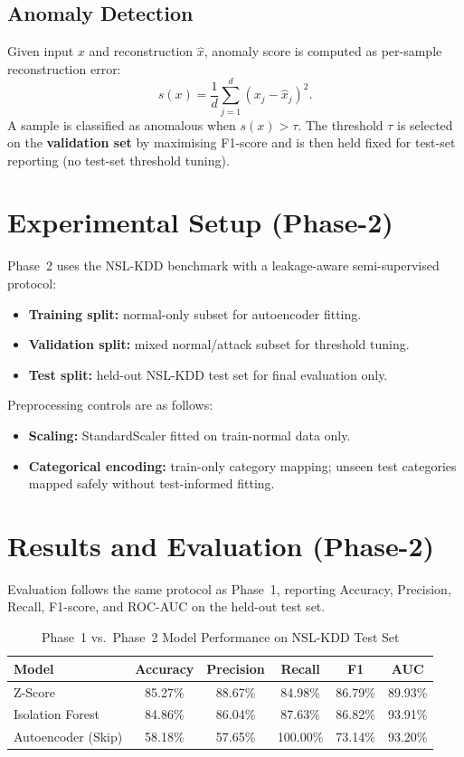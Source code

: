 \documentclass[conference]{IEEEtran}
\begin{document}
\subsection{Anomaly Detection}
Given input \(x\) and reconstruction \(\hat{x}\), anomaly score is computed as
per-sample reconstruction error:
\[
s(x)=\frac{1}{d}\sum_{j=1}^{d}(x_j-\hat{x}_j)^2.
\]
A sample is classified as anomalous when \(s(x)>\tau\). The threshold \(\tau\) is
selected on the \textbf{validation set} by maximising F1-score and is then held
fixed for test-set reporting (no test-set threshold tuning).

\section{Experimental Setup (Phase-2)}
\label{sec:phase2_setup}

Phase~2 uses the NSL-KDD benchmark with a leakage-aware semi-supervised protocol:
\begin{itemize}
  \item \textbf{Training split:} normal-only subset for autoencoder fitting.
  \item \textbf{Validation split:} mixed normal/attack subset for threshold tuning.
  \item \textbf{Test split:} held-out NSL-KDD test set for final evaluation only.
\end{itemize}

\noindent Preprocessing controls are as follows:
\begin{itemize}
  \item \textbf{Scaling:} StandardScaler fitted on train-normal data only.
  \item \textbf{Categorical encoding:} train-only category mapping; unseen test
        categories mapped safely without test-informed fitting.
\end{itemize}

\section{Results and Evaluation (Phase-2)}
\label{sec:phase2_results}

Evaluation follows the same protocol as Phase~1, reporting Accuracy, Precision,
Recall, F1-score, and ROC-AUC on the held-out test set.

\begin{table}[H]
  \centering
  \caption{Phase~1 vs.\ Phase~2 Model Performance on NSL-KDD Test Set}
  \label{tab:phase1_phase2_compare}
  \begin{tabular}{lccccc}
    \toprule
    Model & Accuracy & Precision & Recall & F1 & AUC \\
    \midrule
    Z-Score & 85.27\% & 88.67\% & 84.98\% & 86.79\% & 89.93\% \\
    Isolation Forest & 84.86\% & 86.04\% & 87.63\% & 86.82\% & 93.91\% \\
    Autoencoder (Skip) & 58.18\% & 57.65\% & 100.00\% & 73.14\% & 93.20\% \\
    \bottomrule
  \end{tabular}
\end{table}
\end{document}
